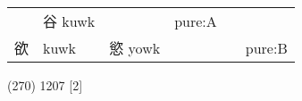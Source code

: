 \documentclass[14pt,a4paper]{scrartcl}
\begin{document}
\begin{longtable}[c]{@{}llllll@{}}
\begin{minipage}[t]{0.14\columnwidth}
\strut\end{minipage} &
\begin{minipage}[t]{0.14\columnwidth}\raggedright\strut
谷 kuwk
\strut\end{minipage} &
\begin{minipage}[t]{0.14\columnwidth}\raggedright\strut
\strut\end{minipage} &
\begin{minipage}[t]{0.14\columnwidth}\raggedright\strut
pure:A
\strut\end{minipage}\tabularnewline
\begin{minipage}[t]{0.14\columnwidth}\raggedright\strut
欲
\strut\end{minipage} &
\begin{minipage}[t]{0.14\columnwidth}\raggedright\strut
kuwk
\strut\end{minipage} &
\begin{minipage}[t]{0.14\columnwidth}\raggedright\strut
慾 yowk
\strut\end{minipage} &
\begin{minipage}[t]{0.14\columnwidth}\raggedright\strut
\strut\end{minipage} &
\begin{minipage}[t]{0.14\columnwidth}\raggedright\strut
\strut\end{minipage} &
\begin{minipage}[t]{0.14\columnwidth}\raggedright\strut
pure:B
\strut\end{minipage}\tabularnewline
\bottomrule
\end{longtable}

(270) 1207 {[}2{]}
\end{document}
